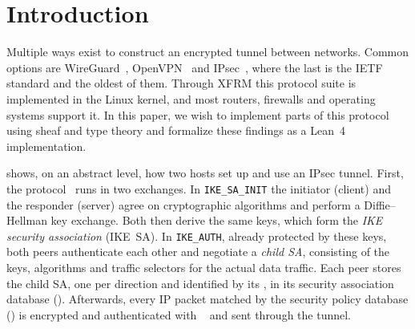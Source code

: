 \section{Introduction}\label{sec:introduction}

Multiple ways exist to construct an encrypted tunnel between networks.
Common options are WireGuard~\cite{donenfeldWireGuard2017}, OpenVPN~\cite{openvpn} and IPsec~\cite{rfc4301}, where the last is the IETF standard and the oldest of them.
Through XFRM this protocol suite is implemented in the Linux kernel, and most routers, firewalls and operating systems support it.
In this paper, we wish to implement parts of this protocol using sheaf and type theory and formalize these findings as a Lean~4 implementation.

 shows, on an abstract level, how two hosts set up and use an IPsec tunnel.
First, the \IKE{} protocol~\cite{rfc7296} runs in two exchanges.
In \texttt{IKE\_SA\_INIT} the initiator (client) and the responder (server) agree on cryptographic algorithms and perform a Diffie--Hellman key exchange. Both then derive the same keys, which form the \emph{IKE security association} (IKE~SA).
In \texttt{IKE\_AUTH}, already protected by these keys, both peers authenticate each other and negotiate a \emph{child SA}, consisting of the keys, algorithms and traffic selectors for the actual data traffic.
Each peer stores the child SA, one per direction and identified by its \SPI{}, in its security association database (\SAD{}).
Afterwards, every IP packet matched by the security policy database (\SPD{}) is encrypted and authenticated with \ESP{}~\cite{rfc4303} and sent through the tunnel.

